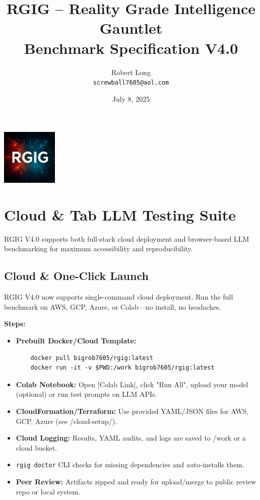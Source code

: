 \documentclass[11pt]{article}
\title{RGIG -- Reality Grade Intelligence Gauntlet\\Benchmark Specification V4.0}
\author{Robert Long \\ \texttt{screwball7605@aol.com}}
\date{July 8, 2025}
\begin{document}
\maketitle

\begin{center}
  \includegraphics[width=0.2\textwidth]{RGIG.png}
\end{center}

\section*{Cloud \& Tab LLM Testing Suite}
RGIG V4.0 supports both full-stack cloud deployment and browser-based LLM benchmarking for maximum accessibility and reproducibility.

\subsection*{Cloud \& One-Click Launch}
RGIG V4.0 now supports single-command cloud deployment. Run the full benchmark on AWS, GCP, Azure, or Colab—no install, no headaches.

\textbf{Steps:}
\begin{itemize}
  \item \textbf{Prebuilt Docker/Cloud Template:}
    \begin{verbatim}
    docker pull bigrob7605/rgig:latest
    docker run -it -v $PWD:/work bigrob7605/rgig:latest
    \end{verbatim}
  \item \textbf{Colab Notebook:} Open [Colab Link], click "Run All", upload your model (optional) or run test prompts on LLM APIs.
  \item \textbf{CloudFormation/Terraform:} Use provided YAML/JSON files for AWS, GCP, Azure (see /cloud-setup/).
  \item \textbf{Cloud Logging:} Results, YAML audits, and logs are saved to /work or a cloud bucket.
  \item \texttt{rgig doctor} CLI checks for missing dependencies and auto-installs them.
  \item \textbf{Peer Review:} Artifacts zipped and ready for upload/merge to public review repo or local system.
\end{itemize}
\end{document}
